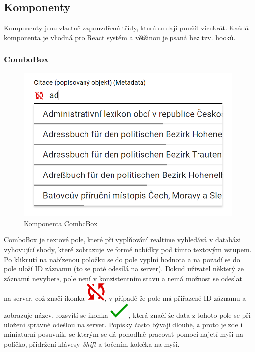 \subsection{Komponenty}
Komponenty jsou vlastně zapouzdřené třídy, které se dají použít vícekrát.
Každá komponenta je vhodná pro React systém a většinou je psaná bez tzv. hooků.

\subsubsection{ComboBox}
\begin{figure}
	\centering
	\includegraphics[width=\linewidth]{img/ComboBox.png}
	\caption{Komponenta ComboBox}
\end{figure}
ComboBox je textové pole, které při vyplňování realtime vyhledává v databázi vyhovující shody,
které zobrazuje ve formě nabídky pod tímto textovým vstupem. Po kliknutí na nabízenou položku se
do pole vyplní hodnota a na pozadí se do pole uloží ID záznamu (to se poté odesílá na server).
Dokud uživatel některý ze záznamů nevybere, pole není v konzistentním stavu a nemá možnost se
odeslat na server, což značí ikonka
\includegraphics[height=\fontcharht\font`\B]{img/notSynced.png},
v případě že pole má přiřazené ID záznamu a zobrazuje název, rozsvítí se ikonka
\includegraphics[height=\fontcharht\font`\B]{img/synced.png},
která značí že data z tohoto pole se při uložení správně odešlou na server.
Popisky často bývají dlouhé, a proto je zde i miniaturní posuvník, se kterým se
dá pohodlně pracovat pomocí najetí myši na políčko, přidržení klávesy \textit{Shift} a
točením kolečka na myši.

